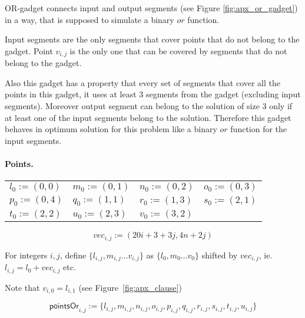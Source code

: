 OR-gadget connects input and output segments (see Figure \ref{fig:apx_or_gadget})
in a way, that is supposed to simulate a binary $or$ function.

Input segments are the only segments that cover points
that do not belong to the gadget.
Point $v_{i,j}$ is the only one that can be covered
by segments that do not belong to the gadget.

Also this gadget has a property that every set of segments
that cover all the points in this gadget, it uses
at least 3 segments from the gadget (excluding input segments).
Moreover output segment can belong to the solution of size 3
only if at least one of the input segments belong to the solution.
Therefore this gadget behaves in optimum solution
for this problem like a binary $or$ function
for the input segments.

\paragraph{Points.}

\newcommand{\chooseOr}[3]{\mathsf{chooseOr}^{#1}_{#2,#3}}
\newcommand{\orMoveVariable}[2]{\mathsf{orMoveVariable}_{#1,#2}}
\newcommand{\pointsOr}[2]{\mathsf{pointsOr}_{#1,#2}}
\newcommand{\segmentsOr}[2]{\mathsf{segmentsOr}_{#1,#2}}



\newcommand{\clauseXFactor}{20}

\begin{center}
	\begin{tabular}{ l l l l}
		$l_0 := (0, 0)$ &
		$m_0 := (0, 1)$ &
		$n_0 := (0, 2)$ &
		$o_0 := (0, 3)$ \\
		$p_0 := (0, 4)$ &
		$q_0 := (1, 1)$ &
		$r_0 := (1, 3)$ &
		$s_0 := (2, 1)$ \\
		$t_0 := (2, 2)$ &
		$u_0 := (2, 3)$ &
		$v_0 := (3, 2)$ &
	\end{tabular}
\end{center}


$$vec_{i, j} := (\clauseXFactor i + 3 + 3j, 4n + 2j)$$

For integers $i,j$,
define 
$\{ l_{i, j}, m_{i, j} \ldots v_{i, j} \}$
as $\{l_0, m_0 \ldots v_0\}$ shifted by $vec_{i, j}$,
ie. $l_{i,j} = l_0 + vec_{i,j}$ etc.

Note that $v_{i, 0} = l_{i, 1}$ (see Figure~\ref{fig:apx_clause})
 
$$\pointsOr{i}{j} := 
 \{l_{i, j}, m_{i, j}, n_{i, j}, o_{i, j},
 p_{i, j}, q_{i, j}, r_{i, j}, s_{i, j}, t_{i, j}, u_{i, j} \}
 $$
 
